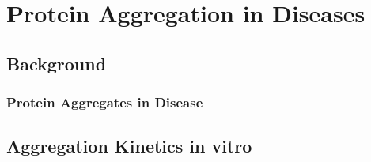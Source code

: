 \newcommand{\nc}[0]{n_{\mathrm{c}}}
\newcommand{\todo}[1]{{\color{red} [#1]}}

\chapter{\label{ch:4-aggregation}Protein Aggregation in Diseases}

\minitoc
\newpage

\section{Background}

\subsection{Protein Aggregates in Disease}

\section{Aggregation Kinetics in vitro}

